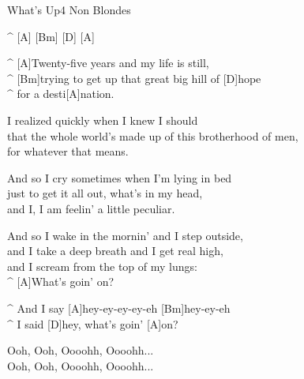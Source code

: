 \vspace{-0.2cm}
\begin{song}{What's Up}{4 Non Blondes}

\begin{guitar}
^ [A] [Bm] [D] [A]\\
\end{guitar}

\begin{guitar}
^ [A]Twenty-five years and my life is still,\\
^ [Bm]trying to get up that great big hill of [D]hope\\
^ for a desti[A]nation.\\
\end{guitar}

\begin{guitar}
I realized quickly when I knew I should\\
that the whole world's made up of this brotherhood of men,\\
for whatever that means.\\
\end{guitar}

\begin{guitar}
And so I cry sometimes when I'm lying in bed\\
just to get it all out, what's in my head,\\
and I, I am feelin' a little peculiar.\\
\end{guitar}

\begin{guitar}
And so I wake in the mornin' and I step outside,\\
and I take a deep breath and I get real high,\\
and I scream from the top of my lungs:\\
^ [A]What's goin' on?\\
\end{guitar}

\begin{guitar}
^ And I say [A]hey-ey-ey-ey-eh [Bm]hey-ey-eh\\
^ I said [D]hey, what's goin' [A]on?\\
\end{guitar}

\begin{guitar}
Ooh, Ooh, Oooohh, Oooohh...\\
Ooh, Ooh, Oooohh, Oooohh...\\
\end{guitar}


\end{song}
